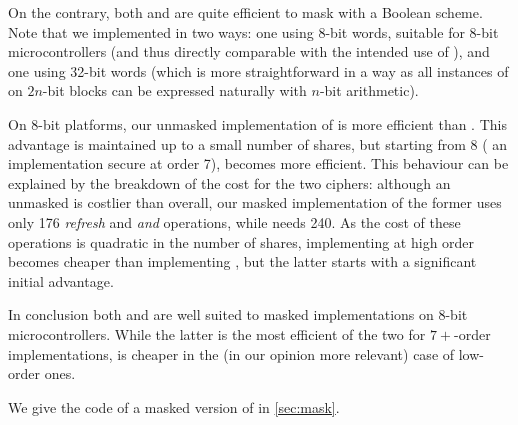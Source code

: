 On the contrary, both \fly and \simon are quite efficient to mask with a Boolean scheme.
Note that we implemented \simonC in two ways: one using 8-bit words, suitable for 8-bit microcontrollers
(and thus directly comparable with the intended use of \fly), and one using 32-bit words (which is more straightforward in a way as all instances of \simon on $2n$-bit blocks
can be expressed naturally with $n$-bit arithmetic).

On 8-bit platforms, our unmasked implementation of \fly is more efficient than \simonC.
This advantage is maintained up to a small number of shares, but starting from 8 (\ie{} an implementation secure at order 7),
\simon becomes more efficient.
This behaviour can be explained by the breakdown of the cost for the two ciphers:
although an unmasked \simonC is costlier than \fly overall,
our masked implementation of the former uses only 176 \emph{refresh} and \emph{and} operations, while \fly needs 240.
As the cost of these operations is quadratic in
the number of shares, implementing \simon at high order becomes cheaper than implementing \fly, but the latter starts with
a significant initial advantage.

In conclusion both \fly and \simon are well suited to masked implementations on 8-bit microcontrollers. While the latter is the most efficient of the
two for $7+$-order implementations, \fly is cheaper in the (in our opinion more relevant) case of low-order ones.

We give the code of a masked version of \fly in \autoref{sec:mask}.

